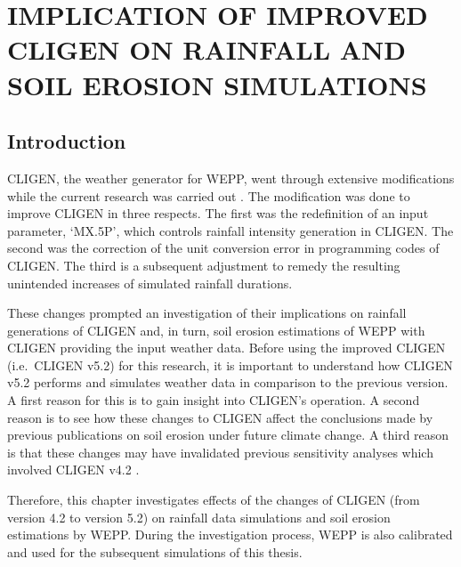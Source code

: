 
\chapter{IMPLICATION OF IMPROVED CLIGEN ON RAINFALL AND SOIL EROSION
SIMULATIONS}
\label{sec:IMPLICATIONSOFIMPROVEDCLIGEN}

\section{Introduction}
\label{sec:ImprovedCligenIntroduction}
CLIGEN, the weather generator for WEPP, went through extensive modifications
while the current research was carried out \citep{yu2000-301}. The modification
was done to improve CLIGEN in three respects. The first was the redefinition of
an input parameter, `{MX.5P}', which controls rainfall intensity generation in
CLIGEN. The second was the correction of the unit conversion error in
programming codes of CLIGEN. The third is a subsequent adjustment to remedy the
resulting unintended increases of simulated rainfall durations.

These changes prompted an investigation of their implications on rainfall
generations of CLIGEN and, in turn, soil erosion estimations of WEPP with CLIGEN
providing the input weather data. Before using the improved CLIGEN (i.e.\ CLIGEN
v5.2) for this research, it is important to understand how CLIGEN v5.2
performs and simulates weather data in comparison to the previous version.
A first reason for this is to gain insight into CLIGEN's operation. A second
reason is to see how these changes to CLIGEN affect the conclusions made by
previous publications on soil erosion under future climate change. A third
reason is that these changes may have invalidated previous sensitivity analyses
which involved CLIGEN v4.2
\citep{baffaut1996-447,zhang1996-855,baffaut1998-756,favis-mortlock1998-141,
favis-mortlock1999-329}.

Therefore, this chapter investigates effects of the changes of CLIGEN (from
version 4.2 to version 5.2) on rainfall data simulations and soil erosion
estimations by WEPP. During the investigation process, WEPP is also calibrated
and used for the subsequent simulations of this thesis.

